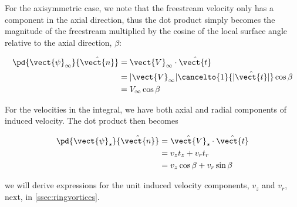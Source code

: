 For the axisymmetric case, we note that the freestream velocity only has a component in the axial direction, thus the dot product simply becomes the magnitude of the freestream multiplied by the cosine of the local surface angle relative to the axial direction, \(\beta\):

\begin{equation}
    \begin{aligned}
        \pd{\vect{\psi}_\infty}{\hat{\vect{n}}} &= \vect{V}_\infty \cdot \hat{\vect{t}} \\
    &= |\vect{V}_\infty|\cancelto{1}{|\hat{\vect{t}}|} \cos\beta\\
    &= V_{\infty} \cos\beta
    \end{aligned}
\end{equation}

For the velocities in the integral, we have both axial and radial components of induced velocity.
%
The dot product then becomes

\begin{equation}
    \begin{aligned}
        \pd{\vect{\psi}_s}{\hat{\vect{n}}} &= \hat{\vect{V}}_s \cdot \hat{\vect{t}} \\
         &= v_z t_z + v_r t_r \\
         &= v_z \cos\beta + v_r \sin\beta
    \end{aligned}
\end{equation}

\where we will derive expressions for the unit induced velocity components, \(v_z\) and \(v_r\), next, in \cref{ssec:ringvortices}.
